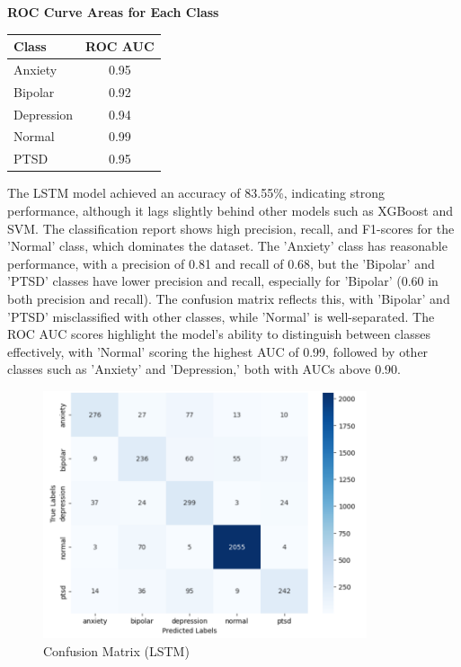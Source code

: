 \vspace{0.25em}

\begin{center}
    \textbf{ROC Curve Areas for Each Class} \\[0.5em]
    \begin{tabular}{|l|c|}
        \hline
        \textbf{Class}  & \textbf{ROC AUC} \\ \hline
        Anxiety         & 0.95            \\ \hline
        Bipolar         & 0.92            \\ \hline
        Depression      & 0.94            \\ \hline
        Normal          & 0.99            \\ \hline
        PTSD            & 0.95            \\ \hline
    \end{tabular}
\end{center}

\vspace{0.25em}

\noindent
The LSTM model achieved an accuracy of 83.55\%, indicating strong performance, although it lags slightly behind other models such as XGBoost and SVM. The classification report shows high precision, recall, and F1-scores for the 'Normal' class, which dominates the dataset. The 'Anxiety' class has reasonable performance, with a precision of 0.81 and recall of 0.68, but the 'Bipolar' and 'PTSD' classes have lower precision and recall, especially for 'Bipolar' (0.60 in both precision and recall). The confusion matrix reflects this, with 'Bipolar' and 'PTSD' misclassified with other classes, while 'Normal' is well-separated. The ROC AUC scores highlight the model's ability to distinguish between classes effectively, with 'Normal' scoring the highest AUC of 0.99, followed by other classes such as 'Anxiety' and 'Depression,' both with AUCs above 0.90.

\begin{figure}[h!]  
    \centering
    \includegraphics[width=0.85\textwidth]{Images/LSTM Confusion Matrix.png}  
    \caption{Confusion Matrix (LSTM)}
    \label{LSTMCM}  %
\end{figure}

